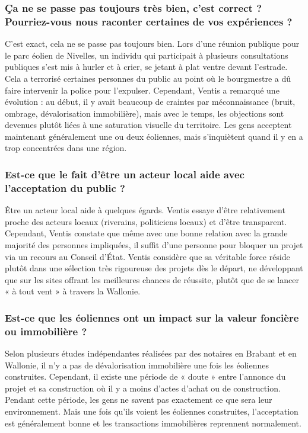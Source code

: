 \subsubsection{Ça ne se passe pas toujours très bien, c'est correct ? Pourriez-vous nous raconter certaines de vos expériences ?}

C'est exact, cela ne se passe pas toujours bien. Lors d'une réunion publique pour le parc éolien de Nivelles, un individu qui participait à plusieurs consultations publiques s'est mis à hurler et à crier, se jetant à plat ventre devant l'estrade. Cela a terrorisé certaines personnes du public au point où le bourgmestre a dû faire intervenir la police pour l'expulser. Cependant, Ventis a remarqué une évolution : au début, il y avait beaucoup de craintes par méconnaissance (bruit, ombrage, dévalorisation immobilière), mais avec le temps, les objections sont devenues plutôt liées à une saturation visuelle du territoire. Les gens acceptent maintenant généralement une ou deux éoliennes, mais s'inquiètent quand il y en a trop concentrées dans une région.

\subsubsection{Est-ce que le fait d'être un acteur local aide avec l'acceptation du public ?}

Être un acteur local aide à quelques égards. Ventis essaye d'être relativement proche des acteurs locaux (riverains, politiciens locaux) et d'être transparent. Cependant, Ventis constate que même avec une bonne relation avec la grande majorité des personnes impliquées, il suffit d'une personne pour bloquer un projet via un recours au Conseil d'État. Ventis considère que sa véritable force réside plutôt dans une sélection très rigoureuse des projets dès le départ, ne développant que sur les sites offrant les meilleures chances de réussite, plutôt que de se lancer « à tout vent » à travers la Wallonie.

\subsubsection{Est-ce que les éoliennes ont un impact sur la valeur foncière ou immobilière ?}

Selon plusieurs études indépendantes réalisées par des notaires en Brabant et en Wallonie, il n'y a pas de dévalorisation immobilière une fois les éoliennes construites. Cependant, il existe une période de « doute » entre l'annonce du projet et sa construction où il y a moins d'actes d'achat ou de construction. Pendant cette période, les gens ne savent pas exactement ce que sera leur environnement. Mais une fois qu'ils voient les éoliennes construites, l'acceptation est généralement bonne et les transactions immobilières reprennent normalement.


